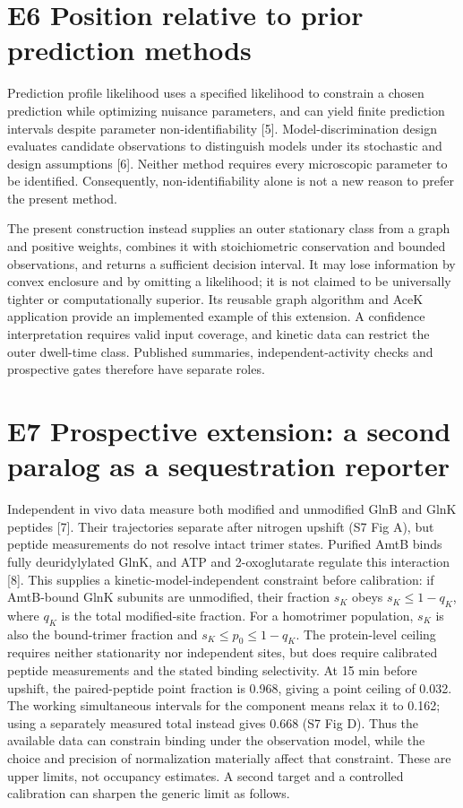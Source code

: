 \documentclass[11pt]{article}
\begin{document}
\section*{E6 Position relative to prior prediction methods}
Prediction profile likelihood uses a specified likelihood to constrain a chosen prediction while optimizing nuisance parameters, and can yield finite prediction intervals despite parameter non-identifiability [5]. Model-discrimination design evaluates candidate observations to distinguish models under its stochastic and design assumptions [6]. Neither method requires every microscopic parameter to be identified. Consequently, non-identifiability alone is not a new reason to prefer the present method.

The present construction instead supplies an outer stationary class from a graph and positive weights, combines it with stoichiometric conservation and bounded observations, and returns a sufficient decision interval. It may lose information by convex enclosure and by omitting a likelihood; it is not claimed to be universally tighter or computationally superior. Its reusable graph algorithm and AceK application provide an implemented example of this extension. A confidence interpretation requires valid input coverage, and kinetic data can restrict the outer dwell-time class. Published summaries, independent-activity checks and prospective gates therefore have separate roles.

\section*{E7 Prospective extension: a second paralog as a sequestration reporter}

Independent in vivo data measure both modified and unmodified GlnB and GlnK peptides [7]. Their trajectories separate after nitrogen upshift (S7 Fig A), but peptide measurements do not resolve intact trimer states. Purified AmtB binds fully deuridylylated GlnK, and ATP and 2-oxoglutarate regulate this interaction [8]. This supplies a kinetic-model-independent constraint before calibration: if AmtB-bound GlnK subunits are unmodified, their fraction $s_K$ obeys $s_K\leq1-q_K$, where $q_K$ is the total modified-site fraction. For a homotrimer population, $s_K$ is also the bound-trimer fraction and $s_K\leq p_0\leq1-q_K$. The protein-level ceiling requires neither stationarity nor independent sites, but does require calibrated peptide measurements and the stated binding selectivity. At 15 min before upshift, the paired-peptide point fraction is 0.968, giving a point ceiling of 0.032. The working simultaneous intervals for the component means relax it to 0.162; using a separately measured total instead gives 0.668 (S7 Fig D). Thus the available data can constrain binding under the observation model, while the choice and precision of normalization materially affect that constraint. These are upper limits, not occupancy estimates. A second target and a controlled calibration can sharpen the generic limit as follows.
\end{document}
